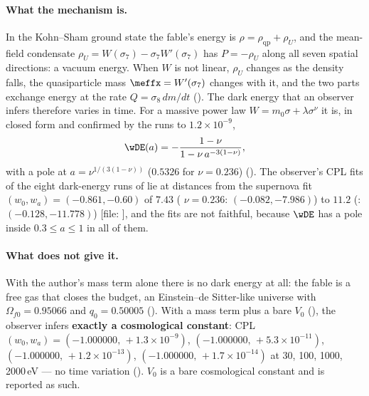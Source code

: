 \paragraph{What the mechanism is.} In the Kohn--Sham ground state the fable's energy is
$\rho=\rho_{\mathrm{qp}}+\rho_U$, and the mean-field condensate $\rho_U=W(\sigma_7)-\sigma_7W'(\sigma_7)$ has
$P=-\rho_U$ along all seven spatial directions: a vacuum energy. When $W$ is not linear, $\rho_U$ changes as the
density falls, the quasiparticle mass $\meffx=W'(\sigma_7)$ changes with it, and the two parts exchange energy at
the rate $Q=\sigma_8\,dm/dt$ (). The dark energy that an observer infers therefore varies in
time. For a massive power law $W=m_0\sigma+\lambda\sigma^\nu$ it is, in closed form and confirmed by the runs to
$1.2\times10^{-9}$,
\[
  \wDE(a)=-\frac{1-\nu}{1-\nu\,a^{-3(1-\nu)}},
\]
with a pole at $a=\nu^{1/(3(1-\nu))}$ ($0.5326$ for $\nu=0.236$) (). The observer's CPL fits of
the eight dark-energy runs of  lie at distances from the supernova fit
$(w_0,w_a)=(-0.861,-0.60)$ of $7.43$ ( $\nu=0.236$: $(-0.082,-7.986)$) to $11.2$ (:
$(-0.128,-11.778)$) [file: ], and the fits are not faithful,
because $\wDE$ has a pole inside $0.3\leq a\leq1$ in all of them.

\paragraph{What does not give it.} With the author's mass term alone there is no dark energy at all: the fable
is a free gas that closes the budget, an Einstein--de Sitter-like universe with $\Omega_{f0}=0.95066$ and
$q_0=0.50005$ (). With a mass term plus a bare $V_0$ (), the observer infers
\textbf{exactly a cosmological constant}: CPL $(w_0,w_a)=(-1.000000,\,+1.3\times10^{-9})$,
$(-1.000000,\,+5.3\times10^{-11})$, $(-1.000000,\,+1.2\times10^{-13})$, $(-1.000000,\,+1.7\times10^{-14})$ at 30,
100, 1000, 2000\,eV --- no time variation (). $V_0$ is a bare cosmological constant and is
reported as such.

